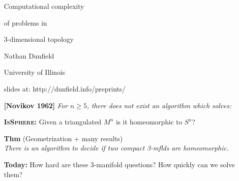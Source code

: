 \documentclass[aspect=4:3]{nmd-slide}
\newcommand{\alg}[1]{\textsc{\textbf{#1}}}
\begin{document}
\begin{frame}

  \begin{center}
    {\Large Computational complexity}
    
    \medskip

    {\Large  of problems in }

    \medskip

    {\Large  3-dimensional topology}

    \vspace{2cm}

    {Nathan Dunfield}

    \smallskip

    University of Illinois

    \vspace{1cm}
    
    slides at: http://dunfield.info/preprints/
    
  \end{center}
\end{frame}

\begin{frame}

\textbf{[Novikov 1962]} \textsl{For $n \geq 5$, there does not exist an algorithm which solves:}

\vspace{0.2cm}

\alg{IsSphere:} Given a triangulated $M^n$ is it homeomorphic to $S^n$?

\vspace{1cm}

\textbf{Thm} (Geometrization + many results)  \\
\textsl{There is an algorithm to decide if two compact 3-mflds are homeomorphic.}

\vspace{3cm}

\textbf{Today:}  How hard are these 3-manifold questions?  How quickly can we solve them?

\vfill
\end{frame}
\end{document}
